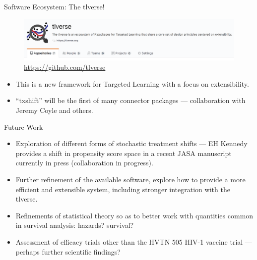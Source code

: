 \documentclass[12pt,t,handout]{beamer}
\begin{document}
\begin{frame}[c]{Software Ecosystem: The tlverse!}

\begin{figure}[H]
  \centering
  \includegraphics[width=\textwidth]{tlverse}
  \caption{
    \url{https://github.com/tlverse}
  }
\end{figure}

\begin{center}
\begin{itemize}
  \itemsep4pt
  \item This is a new framework for Targeted Learning with a focus on
    extensibility.
  \item ``txshift'' will be the first of many connector packages ---
    collaboration with Jeremy Coyle and others.
\end{itemize}
\end{center}


\end{frame}


\begin{frame}[c]{Future Work}

\begin{center}
\begin{itemize}
  \itemsep10pt
  \item Exploration of different forms of stochastic treatment shifts --- EH
    Kennedy provides a shift in propensity score space in a recent JASA
    manuscript currently in press (collaboration in progress).
  \item Further refinement of the available software, explore how to provide a
    more efficient and extensible system, including stronger integration with
    the tlverse.
  \item Refinements of statistical theory so as to better work with quantities
    common in survival analysis: hazards? survival?
  \item Assessment of efficacy trials other than the HVTN 505 HIV-1 vaccine
    trial --- perhaps further scientific findings?
\end{itemize}
\end{center}

\note{
}

\end{frame}
\end{document}
